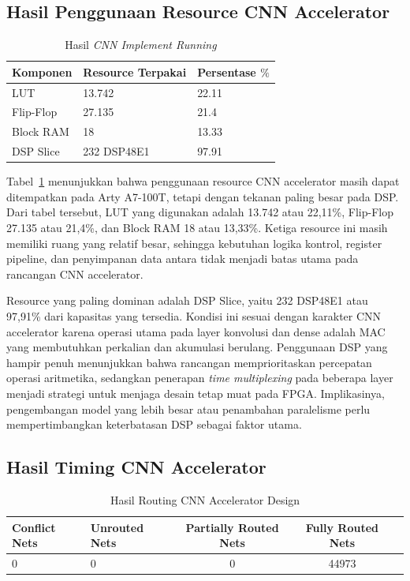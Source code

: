    \subsection{Hasil Penggunaan Resource CNN Accelerator}
	\begin{table}[H]
		\centering
		\caption{Hasil \emph{CNN Implement Running}}
		\label{implement-run-cnn}
		\begin{tabular}{|l|l|l|}
			\hline
			\textbf{Komponen} & \textbf{Resource Terpakai} & \textbf{Persentase} $\%$ \\
			\hline
			LUT & 13.742 & 22.11 \\
			Flip-Flop & 27.135 & 21.4 \\
			Block RAM & 18 & 13.33 \\
			DSP Slice & 232 DSP48E1 & 97.91 \\
			\hline
		\end{tabular}
	\end{table}

Tabel~\ref{implement-run-cnn} menunjukkan bahwa penggunaan resource CNN accelerator masih dapat ditempatkan pada Arty A7-100T, tetapi dengan tekanan paling besar pada DSP. Dari tabel tersebut, LUT yang digunakan adalah 13.742 atau 22,11\%, Flip-Flop 27.135 atau 21,4\%, dan Block RAM 18 atau 13,33\%. Ketiga resource ini masih memiliki ruang yang relatif besar, sehingga kebutuhan logika kontrol, register pipeline, dan penyimpanan data antara tidak menjadi batas utama pada rancangan CNN accelerator.

Resource yang paling dominan adalah DSP Slice, yaitu 232 DSP48E1 atau 97,91\% dari kapasitas yang tersedia. Kondisi ini sesuai dengan karakter CNN accelerator karena operasi utama pada layer konvolusi dan dense adalah MAC yang membutuhkan perkalian dan akumulasi berulang. Penggunaan DSP yang hampir penuh menunjukkan bahwa rancangan memprioritaskan percepatan operasi aritmetika, sedangkan penerapan \emph{time multiplexing} pada beberapa layer menjadi strategi untuk menjaga desain tetap muat pada FPGA. Implikasinya, pengembangan model yang lebih besar atau penambahan paralelisme perlu mempertimbangkan keterbatasan DSP sebagai faktor utama.

    \subsection{Hasil Timing CNN Accelerator}

	\begin{table}[htbp]
	\centering
		\caption{Hasil Routing CNN Accelerator Design}
		\vspace{2mm}
		\small
		\begin{tabular}{llccc}
			\toprule
			\textbf{Conflict Nets} 	&
			\textbf{Unrouted Nets} &
			\textbf{Partially Routed Nets} &
			\textbf{Fully Routed Nets} \\
			\midrule
			0 &
			0 &
			0 &
			44973 \\
			\bottomrule
		\end{tabular}
	\end{table}

